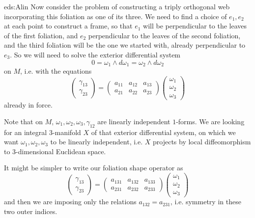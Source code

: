 \begin{answer}{eds:Alin}
Now consider the problem of constructing a triply orthogonal web incorporating this foliation as one of its three.
We need to find a choice of \(e_1,e_2\) at each point to construct a frame, so that \(e_1\) will be perpendicular to the leaves of the first foliation, and \(e_2\) perpendicular to the leaves of the second foliation, and the third foliation will be the one we started with, already perpendicular to \(e_3\).
So we will need to solve the exterior differential system
\[
0=\omega_1\wedge d\omega_1=\omega_2\wedge d\omega_2
\]
on \(M\), i.e. with the equations
\[
\begin{pmatrix}
\gamma_{13}\\
\gamma_{23}
\end{pmatrix}
=
\begin{pmatrix}
a_{11}&a_{12}&a_{13}\\
a_{21}&a_{22}&a_{23}
\end{pmatrix}
\begin{pmatrix}
\omega_1\\
\omega_2\\
\omega_3
\end{pmatrix}
\]
already in force.

Note that on \(M\), \(\omega_1,\omega_2,\omega_3,\gamma_{12}\) are linearly independent \(1\)-forms.
We are looking for an integral \(3\)-manifold \(X\) of that exterior differential system, on which we want \(\omega_1,\omega_2,\omega_3\) to be linearly independent, i.e. \(X\) projects by local diffeomorphism to \(3\)-dimensional Euclidean space.

It might be simpler to write our foliation shape operator as
\[
\begin{pmatrix}
\gamma_{13}\\
\gamma_{23}
\end{pmatrix}
=
\begin{pmatrix}
a_{131}&a_{132}&a_{133}\\
a_{231}&a_{232}&a_{233}
\end{pmatrix}
\begin{pmatrix}
\omega_1\\
\omega_2\\
\omega_3
\end{pmatrix}
\]
and then we are imposing only the relations \(a_{132}=a_{231}\), i.e. symmetry in these two outer indices.


\end{answer}
